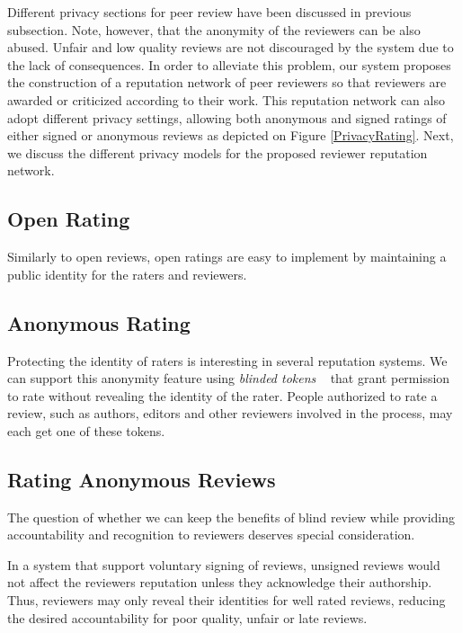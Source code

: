 
Different privacy sections for peer review have been discussed in previous
subsection. Note, however, that the anonymity of the reviewers can be also
abused. Unfair and low quality reviews are not discouraged by the system due to
the lack of consequences. In order to alleviate this problem, our system
proposes the construction of a reputation network of peer reviewers so that
reviewers are awarded or criticized according to their work. This reputation
network can also adopt different privacy settings, allowing both anonymous and
signed ratings of either signed or anonymous reviews as depicted on Figure
\ref{PrivacyRating}. Next, we discuss the different privacy models for the
proposed reviewer reputation network.


\subsection*{Open Rating}
Similarly to open reviews, open ratings are easy to implement by maintaining a
public identity for the raters and reviewers.

\subsection*{Anonymous Rating}

Protecting the identity of raters is interesting in several reputation systems.
We can support this anonymity feature using \emph{blinded tokens}
~\cite{schaub2016trustless} that grant permission to rate without revealing the
identity of the rater. People authorized to rate a review, such as authors,
editors and other reviewers involved in the process, may each get one of these
tokens.

\subsection*{Rating Anonymous Reviews}

The question of whether we can keep the benefits of blind review while providing
accountability and recognition to reviewers deserves special consideration.

In a system that support voluntary signing of reviews, unsigned reviews would
not affect the reviewers reputation unless they acknowledge their authorship.
Thus, reviewers may only reveal their identities for well rated reviews,
reducing the desired accountability for poor quality, unfair or late reviews.

